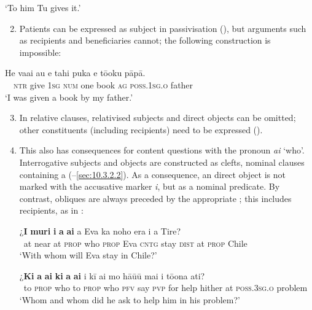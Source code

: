 \glt
‘To him Tu gives it.’ \textstyleExampleref{[R416.080]} 
\z

\begin{enumerate}
\setcounter{enumi}{1}
\item 
Patients can be expressed as subject in passivisation (), but arguments such as recipients and beneficiaries cannot; the following construction is impossible:

\end{enumerate}
\ea\label{ex:8.170}
\gll *He va{\ꞌ}ai au e tahi puka e tō{\ꞌ}oku pāpā.\\
~~\textsc{ntr} give \textsc{1sg} \textsc{num} one book \textsc{ag} \textsc{poss.1sg.o} father\\

\glt
‘I was given a book by my father.’
\z

\begin{enumerate}
\setcounter{enumi}{2}
\item 
In relative clauses, relativised subjects and direct objects can be omitted; other constituents (including recipients) need to be expressed ().

\item 
This also has consequences for content questions with the  pronoun \textit{ai} ‘who’. Interrogative subjects and objects are constructed as clefts, nominal clauses containing a  (–\ref{sec:10.3.2.2}). As a consequence, an  direct object is not marked with the accusative marker \textit{i}, but as a nominal predicate. By contrast,  obliques are always preceded by the appropriate ; this includes recipients, as in :

\ea\label{ex:8.171}
\gll ¿\textbf{{\ꞌ}I} \textbf{muri} \textbf{i} \textbf{a} \textbf{ai} a Eva ka noho era {\ꞌ}i a Tire? \\
~at near at \textsc{prop} who \textsc{prop} Eva \textsc{cntg} stay \textsc{dist} at \textsc{prop} Chile \\

\glt 
‘With whom will Eva stay in Chile?’ \textstyleExampleref{[R615.660]}  
\z

\ea\label{ex:8.172}
\gll ¿\textbf{Ki} \textbf{a} \textbf{ai} \textbf{ki} \textbf{a} \textbf{ai} i kī ai mo hā{\ꞌ}ū{\ꞌ}ū mai {\ꞌ}i tō{\ꞌ}ona {\ꞌ}ati? \\
~to \textsc{prop} who to \textsc{prop} who \textsc{pfv} say \textsc{pvp} for help hither at \textsc{poss.3sg.o} problem \\

\glt
‘Whom and whom did he ask to help him in his problem?’ \textstyleExampleref{[R615.145]} 
\z

\end{enumerate}

